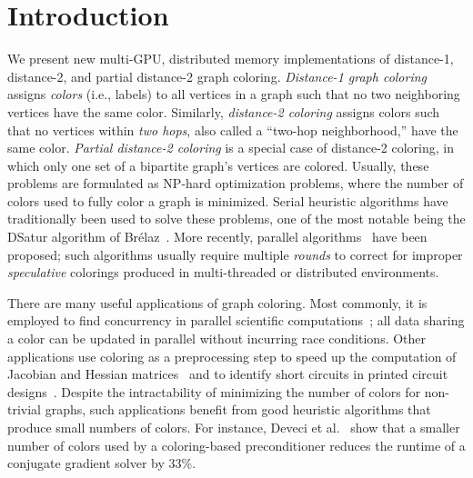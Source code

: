 \section{Introduction}


We present new multi-GPU, distributed memory implementations of distance-1,
distance-2, and partial distance-2 graph coloring.
\emph{Distance-1 graph coloring} assigns \emph{colors} (i.e., labels) to all vertices in a graph such that no two neighboring vertices have the same color. 
Similarly, \emph{distance-2 coloring} assigns colors such that no vertices within \emph{two hops}, also called a ``two-hop neighborhood,'' have the same color. 
\emph{Partial distance-2 coloring} is a special case of distance-2 coloring, in which only one set of a bipartite graph's vertices are colored.
Usually, these problems are formulated as NP-hard optimization problems, where the number of colors used to fully color a graph is minimized.
Serial heuristic algorithms have traditionally been used to solve these problems, one of the most notable being the DSatur algorithm of Br{\'e}laz~\cite{brelaz1979new}.
More recently, parallel algorithms~\cite{IAB:deveci2016parallel,IAB:bozdaug2008framework} have been proposed; such algorithms usually require multiple \emph{rounds} to correct for improper \emph{speculative} colorings produced in multi-threaded or distributed environments.

There are many useful applications of graph coloring.
Most commonly, it is employed to find concurrency in parallel scientific computations~\cite{IAB:deveci2016parallel, IAB:allwright1995comparison}; all data sharing a color can be updated in parallel without incurring race conditions.
Other applications use coloring as a preprocessing step to speed up the computation of Jacobian and Hessian matrices~\cite{IAB:gebremedhin2013colpack} and to identify short circuits in printed circuit designs~\cite{IAB:garey1976application}.
Despite the intractability of minimizing the number of colors for non-trivial graphs, such applications benefit from good heuristic algorithms that produce small numbers of colors.
For instance, Deveci et al.~\cite{IAB:deveci2016parallel} show that a smaller number of colors used by a coloring-based preconditioner reduces the runtime of a conjugate gradient solver by 33\%.

